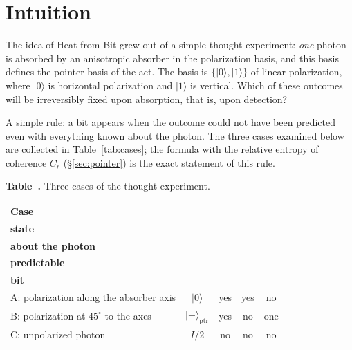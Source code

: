 \documentclass[11pt,a4paper]{article}
\newcommand{\Sref}[1]{\hyperref[#1]{\S\ref{#1}}}
\begin{document}
\section{Intuition}\label{sec:intuition}

The idea of Heat from Bit grew out of a simple thought experiment: \emph{one} photon is absorbed by an anisotropic absorber in the polarization basis, and this basis defines the pointer basis of the act. The basis is $\{|0\rangle,|1\rangle\}$ of linear polarization, where $|0\rangle$ is horizontal polarization and $|1\rangle$ is vertical. Which of these outcomes will be irreversibly fixed upon absorption, that is, upon detection?

A simple rule: a bit appears when the outcome could not have been predicted even with everything known about the photon. The three cases examined below are collected in Table~\ref{tab:cases}; the formula with the relative entropy of coherence $C_r$ (\Sref{sec:pointer}) is the exact statement of this rule.

\vspace{0.4em}
\noindent\begin{minipage}{\textwidth}
\noindent{}\label{tab:cases}%
{\centering
\textbf{Table~\thetable.} Three cases of the thought experiment.\par\vspace{0.25em}
{\footnotesize
\setlength{\tabcolsep}{4pt}
\renewcommand{\arraystretch}{1.12}
\begin{tabular}{|l|c|c|c|c|}
\hline
\textbf{Case} & \makecell{\textbf{Photon}\\\textbf{state}} & \makecell{\textbf{Everything known}\\\textbf{about the photon}} & \makecell{\textbf{Outcome}\\\textbf{predictable}} & \makecell{\textbf{New}\\\textbf{bit}} \\
\hline
A: polarization along the absorber axis & $|0\rangle$ & yes & yes & no \\
\hline
B: polarization at $45^\circ$ to the axes & $|{+}\rangle_{\mathrm{ptr}}$ & yes & no & one \\
\hline
C: unpolarized photon & $I/2$ & no & no & no \\
\hline
\end{tabular}
}
\par}
\end{minipage}
\vspace{0.6em}
\end{document}
